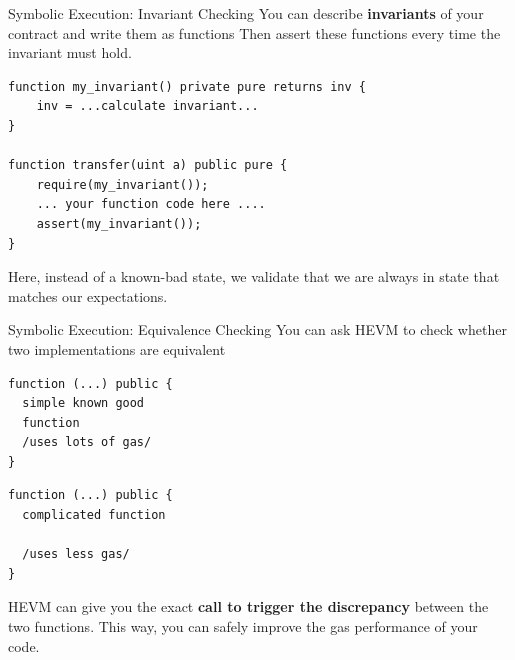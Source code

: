 \documentclass{beamer}
\begin{document}
\begin{frame}[fragile=singleslide]{Symbolic Execution: Invariant Checking}
You can describe \textbf{invariants} of your contract and write them as functions Then assert these functions every time the invariant must hold.
\begin{Verbatim}[frame=single, framerule=0.2mm, framesep=2mm,fontsize=\small]
function my_invariant() private pure returns inv {
	inv = ...calculate invariant...
}
	
function transfer(uint a) public pure {
	require(my_invariant());
	... your function code here ....
	assert(my_invariant());
}
\end{Verbatim}

Here, instead of a known-bad state, we validate that we are always in state that matches our expectations.
\end{frame}	


\begin{frame}[fragile=singleslide]{Symbolic Execution: Equivalence Checking}
You can ask HEVM to check whether two implementations are equivalent
\bigskip
\\

\begin{minipage}[b]{0.45\textwidth}
\begin{Verbatim}[frame=single, framerule=0.2mm, framesep=2mm,fontsize=\small]
function (...) public {
  simple known good
  function
  /uses lots of gas/
}
    \end{Verbatim}
  \end{minipage}
  \begin{minipage}[b]{0.45\textwidth}
  \begin{Verbatim}[frame=single, framerule=0.2mm, framesep=2mm,fontsize=\small]
function (...) public {
  complicated function
  
  /uses less gas/
}
\end{Verbatim}
\end{minipage}

HEVM can give you the exact \textbf{call to trigger the discrepancy} between the two functions. This way, you can safely improve the gas performance of your code.
\end{frame}
\end{document}
